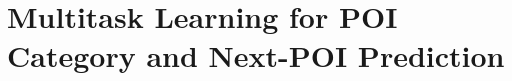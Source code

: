 \chapter[Multitask Learning for POI Category and Next-POI Prediction]{Multitask Learning for POI Category and Next-POI Prediction}
\label{ch:cbic}

